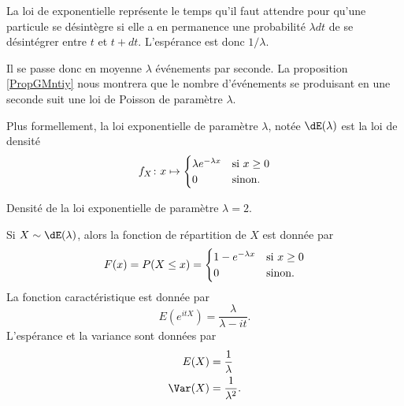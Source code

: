 La loi de exponentielle représente le temps qu'il faut attendre pour qu'une particule se désintègre si elle a en permanence une probabilité \( \lambda dt\) de se désintégrer entre \( t\) et \( t+dt\). L'espérance est donc \( 1/\lambda\).

Il se passe donc en moyenne \( \lambda\) événements par seconde. La proposition \ref{PropGMntiy} nous montrera que le nombre d'événements se produisant en une seconde suit une loi de Poisson de paramètre \( \lambda\).

Plus formellement, la loi exponentielle de paramètre \( \lambda\), notée \( \dE(\lambda)\) est la loi de densité
\begin{equation}
    f_X\colon x\mapsto\begin{cases}
        \lambda e^{-\lambda x}    &   \text{si \( x\geq 0\)}\\
        0    &    \text{sinon}.
    \end{cases}
\end{equation}

Densité de la loi exponentielle de paramètre \( \lambda=2\).

\begin{center}
   
\end{center}

\begin{proposition} \label{PropTxGcWn}
    Si \( X\sim\dE(\lambda)\), alors la fonction de répartition de \( X\) est donnée par
    \begin{equation}
        F(x)=P(X\leq x)=\begin{cases}
            1- e^{-\lambda x}    &   \text{si \( x\geq 0\)}\\
            0    &    \text{sinon}.
    \end{cases}
    \end{equation}
    La fonction caractéristique est donnée par
    \begin{equation}
        E( e^{itX})=\frac{ \lambda }{ \lambda-it }.
    \end{equation}
    L'espérance et la variance sont données par
    \begin{equation}
        \begin{aligned}[]
            E(X)&=\frac{1}{ \lambda }\\
            \Var(X)&=\frac{1}{ \lambda^2 }.
        \end{aligned}
    \end{equation}
\end{proposition}

